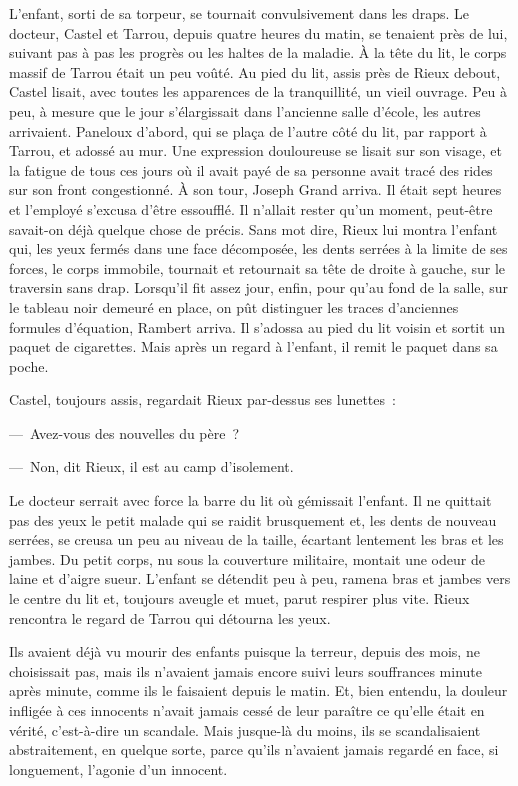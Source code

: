 \documentclass[french,twoside]{book} %
\begin{document}
L’enfant, sorti de sa torpeur, se tournait convulsivement dans les draps. Le docteur, Castel et Tarrou, depuis quatre heures du matin, se tenaient près de lui, suivant pas à pas les progrès ou les haltes de la maladie. À la tête du lit, le corps massif de Tarrou était un peu voûté. Au pied du lit, assis près de Rieux debout, Castel lisait, avec toutes les apparences de la tranquillité, un vieil ouvrage. Peu à peu, à mesure que le jour s’élargissait dans l’ancienne salle d’école, les autres arrivaient. Paneloux d’abord, qui se plaça de l’autre côté du lit, par rapport à Tarrou, et adossé au mur. Une expression douloureuse se lisait sur son visage, et la fatigue de tous ces jours où il avait payé de sa personne avait tracé des rides sur son front congestionné. À son tour, Joseph Grand arriva. Il était sept heures et l’employé s’excusa d’être essoufflé. Il n’allait rester qu’un moment, peut-être savait-on déjà quelque chose de précis. Sans mot dire, Rieux lui montra l’enfant qui, les yeux fermés dans une face décomposée, les dents serrées à la limite de ses forces, le corps immobile, tournait et retournait sa tête de droite à gauche, sur le traversin sans drap. Lorsqu’il fit assez jour, enfin, pour qu’au fond de la salle, sur le tableau noir demeuré en place, on pût distinguer les traces d’anciennes formules d’équation, Rambert arriva. Il s’adossa au pied du lit voisin et sortit un paquet de cigarettes. Mais après un regard à l’enfant, il remit le paquet dans sa poche.\par
Castel, toujours assis, regardait Rieux par-dessus ses lunettes :\par
— Avez-vous des nouvelles du père ?\par
— Non, dit Rieux, il est au camp d’isolement.\par
Le docteur serrait avec force la barre du lit où gémissait l’enfant. Il ne quittait pas des yeux le petit malade qui se raidit brusquement et, les dents de nouveau serrées, se creusa un peu au niveau de la taille, écartant lentement les bras et les jambes. Du petit corps, nu sous la couverture militaire, montait une odeur de laine et d’aigre sueur. L’enfant se détendit peu à peu, ramena bras et jambes vers le centre du lit et, toujours aveugle et muet, parut respirer plus vite. Rieux rencontra le regard de Tarrou qui détourna les yeux.\par
Ils avaient déjà vu mourir des enfants puisque la terreur, depuis des mois, ne choisissait pas, mais ils n’avaient jamais encore suivi leurs souffrances minute après minute, comme ils le faisaient depuis le matin. Et, bien entendu, la douleur infligée à ces innocents n’avait jamais cessé de leur paraître ce qu’elle était en vérité, c’est-à-dire un scandale. Mais jusque-là du moins, ils se scandalisaient abstraitement, en quelque sorte, parce qu’ils n’avaient jamais regardé en face, si longuement, l’agonie d’un innocent.\par
\end{document}
